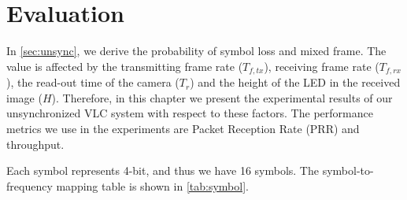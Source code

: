 \section{Evaluation}


 In \autoref{sec:unsync}, we derive the probability of symbol loss and mixed frame. The value is affected by the transmitting frame rate ($T_{f,tx}$), receiving frame rate ($T_{f,rx}$), the read-out time of the camera ($T_r$) and the height of the LED in the received image ($H$). 
 Therefore, in this chapter we present the experimental results of our unsynchronized VLC system with respect to these factors. The performance metrics we use in the experiments are Packet Reception Rate (PRR) and throughput.

Each symbol represents 4-bit, and thus we have 16 symbols. The symbol-to-frequency mapping table is shown in \autoref{tab:symbol}.

